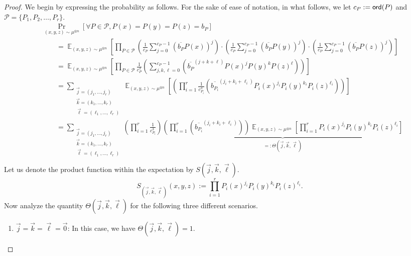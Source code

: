\documentclass[10pt,a4paper]{amsart}
\newcommand\Prob[2]{{\Pr_{#1}\left[ {#2} \right]}}
\newcommand\Expect[2]{{\mathop{\mathbb{E}}_{#1}\left[ {#2} \right]}}
\begin{document}
{    \begin{proof}
      We begin by expressing the probability as follows. For the sake of ease of notation, in what follows, we let $c_P:={\sf ord}(P)$ and $\mathcal{P} = \{ P_1, P_2, \ldots, P_r\}$.
      \begin{align*}
          &\Prob{(x,y,z)\sim\mu^{\otimes n}}{\forall P\in \mathcal{P}, P(x)=P(y)=P(z) = b_P} \\
          &\quad\quad= \Expect{(x,y,z)\sim\mu^{\otimes n}}{\prod_{P\in \mathcal{P}}\left( \frac{1}{c_P} \sum_{j=0}^{c_P-1}\left(\overline{b_P}P(x)\right)^j\right)\cdot \left( \frac{1}{c_P} \sum_{j=0}^{c_P-1}\left(\overline{b_P}P(y)\right)^j\right)\cdot \left( \frac{1}{c_P} \sum_{j=0}^{c_P-1}\left(\overline{b_P}P(z)\right)^j\right)}\\
          &\quad\quad= \Expect{(x,y,z)\sim\mu^{\otimes n}}{\prod_{P\in \mathcal{P}} \frac{1}{c_P^3}\left(  \sum_{j, k, \ell=0}^{c_P-1}\left(\overline{b_P}^{(j+k+\ell)}P(x)^j P(y)^k P(z)^\ell\right)\right)}\\
         &\quad\quad= \sum_{\substack{\vec{j} = (j_1, \ldots, j_r) \\ \vec{k} = (k_1, \ldots, k_r) \\ \vec{\ell} = (\ell_1, \ldots, \ell_r)}}\Expect{(x,y,z)\sim\mu^{\otimes n}}{\left(  \prod_{i=1}^r \frac{1}{c_{P_i}^3}\left(\overline{b_{P_i}}^{(j_i +k_i+\ell_i)} P_i(x)^{j_i} P_i(y)^{k_i} P_i(z)^{\ell_i}\right)\right)}\\
          &\quad\quad= \sum_{\substack{\vec{j} = (j_1, \ldots, j_r) \\ \vec{k} = (k_1, \ldots, k_r) \\ \vec{\ell} = (\ell_1, \ldots, \ell_r)}}  \left(\prod_{i=1}^r \frac{1}{c_{P_i}^3}\right)\underbrace{\left(\prod_{i=1}^r \left(\overline{b_{P_i}}^{(j_i +k_i+\ell_i)}\right) \right) \Expect{(x,y,z)\sim\mu^{\otimes n}}{\prod_{i=1}^r P_i(x)^{j_i} P_i(y)^{k_i} P_i(z)^{\ell_i}}}_{=:\Theta(\vec{j}, \vec{k}, \vec{\ell})}\\
      \end{align*}
     Let us denote the product function within the expectation by $S(\vec{j}, \vec{k}, \vec{\ell})$.
     $$ S_{(\vec{j}, \vec{k}, \vec{\ell})}(x, y, z):= \prod_{i=1}^r P_i(x)^{j_i} P_i(y)^{k_i} P_i(z)^{\ell_i}.$$
     Now analyze the quantity $\Theta(\vec{j}, \vec{k}, \vec{\ell})$ for the following three different scenarios. 
     \begin{enumerate}
         \item[(a)] $\vec{j} = \vec{k} = \vec{\ell} = \vec{0}$: In this case, we have $\Theta(\vec{j}, \vec{k}, \vec{\ell})= 1$.
         

\end{enumerate}
\end{proof}}
\end{document}
